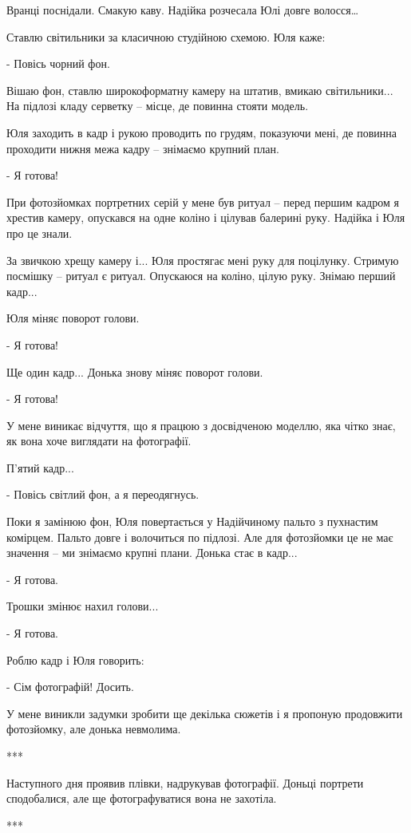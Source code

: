 Вранці поснідали. Смакую каву. Надійка розчесала Юлі довге волосся…

Ставлю світильники за класичною студійною схемою. Юля каже:

- Повісь чорний фон. 

Вішаю фон, ставлю широкоформатну камеру на штатив, вмикаю світильники... На
підлозі кладу серветку – місце, де повинна стояти модель.


Юля заходить в кадр і рукою проводить по грудям, показуючи мені, де повинна
проходити нижня межа кадру – знімаємо крупний план. 

- Я готова!

При фотозйомках портретних серій у мене був ритуал – перед першим кадром я
хрестив камеру, опускався на одне коліно і цілував балерині руку. Надійка і Юля
про це знали. 

За звичкою хрещу камеру і... Юля простягає мені руку для поцілунку. Стримую
посмішку – ритуал є ритуал. Опускаюся на коліно, цілую руку. Знімаю перший
кадр... 

Юля міняє поворот голови.

- Я готова!

Ще один кадр... Донька знову міняє поворот голови.

- Я готова!

У мене виникає відчуття, що я працюю з досвідченою моделлю, яка чітко знає, як
вона хоче виглядати на фотографії. 


П’ятий кадр...

- Повісь світлий фон, а я переодягнусь.

Поки я замінюю фон, Юля повертається у Надійчиному пальто з пухнастим комірцем.
Пальто довге і волочиться по підлозі. Але для фотозйомки це не має значення –
ми знімаємо крупні плани. Донька стає в кадр...

- Я готова.

Трошки змінює нахил голови...

- Я готова.

Роблю кадр і Юля говорить:

- Сім фотографій! Досить. 

У мене виникли задумки зробити ще декілька сюжетів і я пропоную продовжити
фотозйомку, але донька невмолима. 

***

Наступного дня проявив плівки, надрукував фотографії. Доньці портрети
сподобалися, але ще фотографуватися вона не захотіла. 

***

